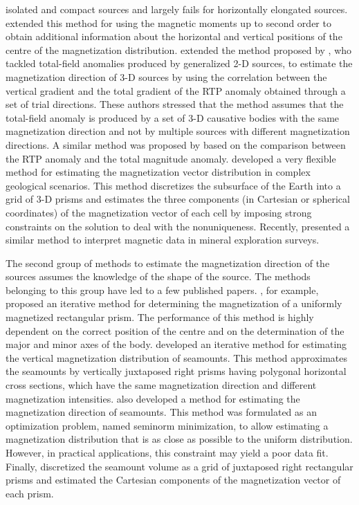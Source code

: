 \documentclass[journal abbreviation, npg]{copernicus}
\begin{document}
isolated and compact sources and largely fails for horizontally elongated
sources. \citet{tontini-pedersen2008} extended this method for using the
magnetic moments up to second order to obtain additional information about
the horizontal and vertical positions of the centre of the magnetization
distribution. \citet{dannemiller-li2006} extended the method proposed by
\citet{roest-pilkington1993}, who tackled total-field anomalies produced by
generalized 2-D sources, to estimate the magnetization direction of 3-D
sources by using the correlation between the vertical gradient and the total
gradient of the RTP anomaly obtained through a set of trial directions. These
authors stressed that the method assumes that the total-field anomaly is
produced by a set of 3-D causative bodies with the same magnetization
direction and not by multiple sources with different magnetization
directions. A similar method was proposed by \citet{gerovska-etal2009} based
on the comparison between the RTP anomaly and the total magnitude anomaly.
\citet{lelievre-oldenburg2009} developed a very flexible method for
estimating the magnetization vector distribution in complex geological
scenarios. This method discretizes the subsurface of the Earth into a grid of
3-D prisms and estimates the three components (in Cartesian or spherical
coordinates) of the magnetization vector of each cell by imposing strong
constraints on the solution to deal with the nonuniqueness. Recently,
\citet{ellis-etal2012} presented a similar method to interpret magnetic data
in mineral exploration surveys.

The second group of methods to estimate the magnetization direction of
the sources assumes the knowledge of the shape of the source. The
methods belonging to this group have led to a few published
papers. \citet{bhattacharyya1966}, for example, proposed an iterative
method for determining the magnetization of a uniformly magnetized
rectangular prism. The performance of this method is highly dependent
on the correct position of the centre and on the determination of the
major and minor axes of the body. \citet{emilia-massey1974} developed
an iterative method for estimating the vertical magnetization
distribution of seamounts. This method approximates the seamounts by
vertically juxtaposed right prisms having polygonal horizontal cross
sections, which have the same magnetization direction and different
magnetization intensities. \citet{parker-etal1987} also developed
a method for estimating the magnetization direction of seamounts. This
method was formulated as an optimization problem, named seminorm
minimization, to allow estimating a magnetization distribution that is
as close as possible to the uniform distribution. However, in
practical applications, this constraint may yield a poor data
fit. Finally, \citet{kubota-uchiyama2005} discretized the seamount
volume as a grid of juxtaposed right rectangular prisms and estimated
the Cartesian components of the magnetization vector of each prism.
\end{document}
